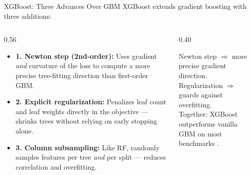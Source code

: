 \documentclass[aspectratio=169, 10pt]{beamer}
\begin{document}
\begin{frame}{XGBoost: Three Advances Over GBM}
  XGBoost \parencite{Chen2016} extends gradient boosting with three additions:

  \begin{columns}[T]
    \begin{column}{0.56\textwidth}
      \begin{itemize}
        \item \textbf{1. Newton step (2nd-order):} Uses gradient \emph{and}
              curvature of the loss to compute a more precise tree-fitting direction
              than first-order GBM.
        \item \textbf{2. Explicit regularization:} Penalizes leaf count and leaf
              weights directly in the objective — shrinks trees without relying on
              early stopping alone.
        \item \textbf{3. Column subsampling:} Like RF, randomly samples features
              per tree \emph{and} per split — reduces correlation and overfitting.
      \end{itemize}
    \end{column}
    \begin{column}{0.40\textwidth}
      \begin{keybox}
        Newton step $\Rightarrow$ more precise gradient direction.\\[2pt]
        Regularization $\Rightarrow$ guards against overfitting.\\[2pt]
        Together: XGBoost outperforms vanilla GBM on most benchmarks \parencite{Chen2016}.
      \end{keybox}
    \end{column}
  \end{columns}
\end{frame}
\end{document}

